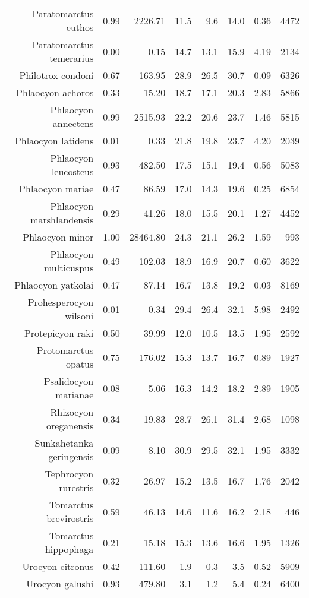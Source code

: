 \begin{table}[ht]
\begin{tabular}{rrrrrrrr}
  Paratomarctus euthos & 0.99 & 2226.71 & 11.5 & 9.6 & 14.0 & 0.36 & 4472 \\ 
  Paratomarctus temerarius & 0.00 & 0.15 & 14.7 & 13.1 & 15.9 & 4.19 & 2134 \\ 
  Philotrox condoni & 0.67 & 163.95 & 28.9 & 26.5 & 30.7 & 0.09 & 6326 \\ 
  Phlaocyon achoros & 0.33 & 15.20 & 18.7 & 17.1 & 20.3 & 2.83 & 5866 \\ 
  Phlaocyon annectens & 0.99 & 2515.93 & 22.2 & 20.6 & 23.7 & 1.46 & 5815 \\ 
  Phlaocyon latidens & 0.01 & 0.33 & 21.8 & 19.8 & 23.7 & 4.20 & 2039 \\ 
  Phlaocyon leucosteus & 0.93 & 482.50 & 17.5 & 15.1 & 19.4 & 0.56 & 5083 \\ 
  Phlaocyon mariae & 0.47 & 86.59 & 17.0 & 14.3 & 19.6 & 0.25 & 6854 \\ 
  Phlaocyon marshlandensis & 0.29 & 41.26 & 18.0 & 15.5 & 20.1 & 1.27 & 4452 \\ 
  Phlaocyon minor & 1.00 & 28464.80 & 24.3 & 21.1 & 26.2 & 1.59 & 993 \\ 
  Phlaocyon multicuspus & 0.49 & 102.03 & 18.9 & 16.9 & 20.7 & 0.60 & 3622 \\ 
  Phlaocyon yatkolai & 0.47 & 87.14 & 16.7 & 13.8 & 19.2 & 0.03 & 8169 \\ 
  Prohesperocyon wilsoni & 0.01 & 0.34 & 29.4 & 26.4 & 32.1 & 5.98 & 2492 \\ 
  Protepicyon raki & 0.50 & 39.99 & 12.0 & 10.5 & 13.5 & 1.95 & 2592 \\ 
  Protomarctus opatus & 0.75 & 176.02 & 15.3 & 13.7 & 16.7 & 0.89 & 1927 \\ 
  Psalidocyon marianae & 0.08 & 5.06 & 16.3 & 14.2 & 18.2 & 2.89 & 1905 \\ 
  Rhizocyon oreganensis & 0.34 & 19.83 & 28.7 & 26.1 & 31.4 & 2.68 & 1098 \\ 
  Sunkahetanka geringensis & 0.09 & 8.10 & 30.9 & 29.5 & 32.1 & 1.95 & 3332 \\ 
  Tephrocyon rurestris & 0.32 & 26.97 & 15.2 & 13.5 & 16.7 & 1.76 & 2042 \\ 
  Tomarctus brevirostris & 0.59 & 46.13 & 14.6 & 11.6 & 16.2 & 2.18 & 446 \\ 
  Tomarctus hippophaga & 0.21 & 15.18 & 15.3 & 13.6 & 16.6 & 1.95 & 1326 \\ 
  Urocyon citronus & 0.42 & 111.60 & 1.9 & 0.3 & 3.5 & 0.52 & 5909 \\ 
  Urocyon galushi & 0.93 & 479.80 & 3.1 & 1.2 & 5.4 & 0.24 & 6400 \\ 

\end{tabular}
\end{table}
